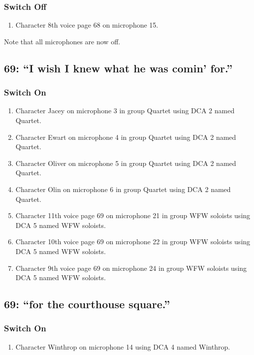 \subsubsection* {Switch Off}
\begin{enumerate}
\item Character 8th voice page 68 on microphone 15.
\end{enumerate}
Note that all microphones are now off.
\subsection* {69: ``I wish I knew what he was comin' for.''}
\subsubsection* {Switch On}
\begin{enumerate}
\item Character Jacey on microphone 3 in group Quartet using DCA 2 named Quartet.
\item Character Ewart on microphone 4 in group Quartet using DCA 2 named Quartet.
\item Character Oliver on microphone 5 in group Quartet using DCA 2 named Quartet.
\item Character Olin on microphone 6 in group Quartet using DCA 2 named Quartet.
\item Character 11th voice page 69 on microphone 21 in group WFW soloists using DCA 5 named WFW soloists.
\item Character 10th voice page 69 on microphone 22 in group WFW soloists using DCA 5 named WFW soloists.
\item Character 9th voice page 69 on microphone 24 in group WFW soloists using DCA 5 named WFW soloists.
\end{enumerate}
\subsection* {69: ``for the courthouse square.''}
\subsubsection* {Switch On}
\begin{enumerate}
\item Character Winthrop on microphone 14 using DCA 4 named Winthrop.
\end{enumerate}
